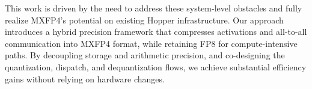This work is driven by the need to address these system-level obstacles and fully realize MXFP4's potential on existing Hopper infrastructure. Our approach introduces a hybrid precision framework that compresses activations and all-to-all communication into MXFP4 format, while retaining FP8 for compute-intensive paths. By decoupling storage and arithmetic precision, and co-designing the quantization, dispatch, and dequantization flows, we achieve substantial efficiency gains without relying on hardware changes.